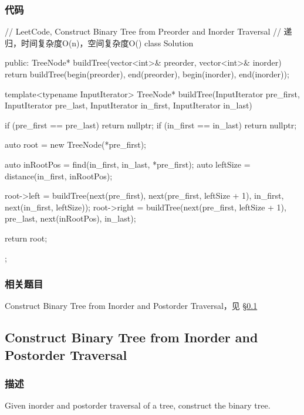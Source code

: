 \subsubsection{代码}
\begin{Code}
// LeetCode, Construct Binary Tree from Preorder and Inorder Traversal
// 递归，时间复杂度O(n)，空间复杂度O(\logn)
class Solution {
public:
    TreeNode* buildTree(vector<int>& preorder, vector<int>& inorder) {
        return buildTree(begin(preorder), end(preorder),
                begin(inorder), end(inorder));
    }

    template<typename InputIterator>
    TreeNode* buildTree(InputIterator pre_first, InputIterator pre_last,
            InputIterator in_first, InputIterator in_last) {
        if (pre_first == pre_last) return nullptr;
        if (in_first == in_last) return nullptr;

        auto root = new TreeNode(*pre_first);

        auto inRootPos = find(in_first, in_last, *pre_first);
        auto leftSize = distance(in_first, inRootPos);

        root->left = buildTree(next(pre_first), next(pre_first,
                leftSize + 1), in_first, next(in_first, leftSize));
        root->right = buildTree(next(pre_first, leftSize + 1), pre_last,
                next(inRootPos), in_last);

        return root;
    }
};
\end{Code}


\subsubsection{相关题目}
\begindot
\item Construct Binary Tree from Inorder and Postorder Traversal，见 \S \ref{sec:construct-binary-tree-from-inorder-and-postorder-traversal}
\myenddot


\subsection{Construct Binary Tree from Inorder and Postorder Traversal}
\label{sec:construct-binary-tree-from-inorder-and-postorder-traversal}


\subsubsection{描述}
Given inorder and postorder traversal of a tree, construct the binary tree.

